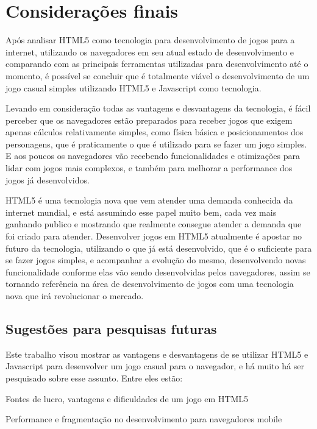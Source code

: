 \section{Considerações finais}

Após analisar HTML5 como tecnologia para desenvolvimento de jogos para
a internet, utilizando os navegadores em seu atual estado de
desenvolvimento e comparando com as principais ferramentas utilizadas
para desenvolvimento até o momento, é possível se concluir que é
totalmente viável o desenvolvimento de um jogo casual simples
utilizando HTML5 e Javascript como tecnologia.

Levando em consideração todas as vantagens e desvantagens da
tecnologia, é fácil perceber que os navegadores estão preparados para
receber jogos que exigem apenas cálculos relativamente
simples, como física básica e posicionamentos dos personagens, que é
praticamente o que é utilizado para se fazer um jogo simples. E aos
poucos os navegadores vão recebendo funcionalidades e otimizações para
lidar com jogos mais complexos, e também para melhorar a performance
dos jogos já desenvolvidos.

HTML5 é uma tecnologia nova que vem atender uma demanda conhecida da
internet mundial, e está assumindo esse papel muito bem, cada vez mais
ganhando publico e mostrando que realmente consegue atender a demanda
que foi criado para atender. Desenvolver jogos em HTML5 atualmente é
apostar no futuro da tecnologia, utilizando o que já está
desenvolvido, que é o suficiente para se fazer jogos simples, e
acompanhar a evolução do mesmo, desenvolvendo novas funcionalidade
conforme elas vão sendo desenvolvidas pelos navegadores, assim se
tornando referência na área de desenvolvimento de jogos com uma
tecnologia nova que irá revolucionar o mercado.

\subsection{Sugestões para pesquisas futuras}

Este trabalho visou mostrar as vantagens e desvantagens de se utilizar
HTML5 e Javascript para desenvolver um jogo casual para o navegador,
e há muito há ser pesquisado sobre esse assunto. Entre eles
estão:

Fontes de lucro, vantagens e dificuldades de um jogo em HTML5

Performance e fragmentação no desenvolvimento para navegadores mobile
